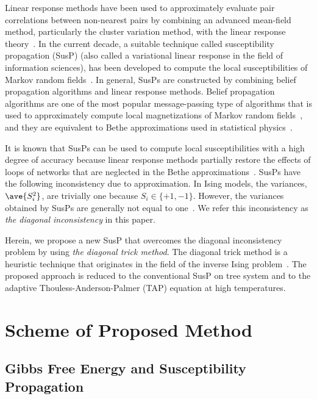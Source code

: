 \documentclass[%
 reprint,
 amsmath,amssymb,
 aps, 
 pre,
 showkeys
]{revtex4-1}
\begin{document}
Linear response methods have been used to approximately evaluate pair correlations between non-nearest pairs by combining an advanced mean-field method, 
particularly the cluster variation method, with the linear response theory~\cite{Sanchez1982, Morita1990}. 
In the current decade, a suitable technique called susceptibility propagation (SusP) (also called a variational linear response in the field of information sciences), 
has been developed to compute the local susceptibilities of Markov random fields~\cite{K.Tanaka2003, Welling&Teh2003, Welling&Teh2004, Mezard&Mora2009}. 
In general, SusPs are constructed by combining belief propagation algorithms and linear response methods.
Belief propagation algorithms are one of the most popular message-passing type of algorithms 
that is used to approximately compute local magnetizations of Markov random fields~\cite{Pearl1988}, 
and they are equivalent to Bethe approximations \cite{Bethe1935} used in statistical physics~\cite{Kabashima&Saad1998, GBP2001}. 


It is known that SusPs can be used to compute local susceptibilities with a high degree of accuracy because linear response methods 
partially restore the effects of loops of networks that are neglected in the Bethe approximations~\cite{Yasuda&Tanaka2007}. 
SusPs have the following inconsistency due to approximation.
In Ising models, the variances, $\ave{S_i^2}$, are trivially one because $S_i \in \{+ 1, -1\}$.
However, the variances obtained by SusPs are generally not equal to one~\cite{Yasuda&Tanaka2007}. 
We refer this inconsistency as \textit{the diagonal inconsistency} in this paper.

Herein, we propose a new SusP that overcomes the diagonal inconsistency problem by using \textit{the diagonal trick method}. 
The diagonal trick method is a heuristic technique that originates in the field of the inverse Ising problem~\cite{KR1998, T.Tanaka1998, Yasuda&Tanaka2009}. 
The proposed approach is reduced to the conventional SusP on tree system and 
to the adaptive Thouless-Anderson-Palmer (TAP) equation \cite{Opper&Winther2001a, Opper&Winther2001b} at high temperatures. 

\section{Scheme of Proposed Method} \label{Sec:OurScheme}

\subsection{Gibbs Free Energy and Susceptibility Propagation} \label{SubSec:GFE&SusP}
\end{document}
